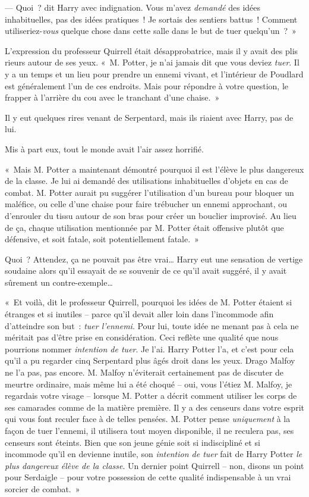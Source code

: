 --- Quoi~? dit Harry avec indignation. Vous m'avez \emph{demandé} des idées inhabituelles, pas des idées pratiques~! Je sortais des sentiers battus~! Comment utiliseriez-\emph{vous} quelque chose dans cette salle dans le but de tuer quelqu'un~?~»

L'expression du professeur Quirrell était désapprobatrice, mais il y avait des plis rieurs autour de ses yeux. «~M. Potter, je n'ai jamais dit que vous deviez \emph{tuer}. Il y a un temps et un lieu pour prendre un ennemi vivant, et l'intérieur de Poudlard est généralement l'un de ces endroits. Mais pour répondre à votre question, le frapper à l'arrière du cou avec le tranchant d'une chaise.~»

Il y eut quelques rires venant de Serpentard, mais ils riaient avec Harry, pas de lui.

Mis à part eux, tout le monde avait l'air assez horrifié.

«~Mais M. Potter a maintenant démontré pourquoi il est l'élève le plus dangereux de la classe. Je lui ai demandé des utilisations inhabituelles d'objets en cas de combat. M. Potter aurait pu suggérer l'utilisation d'un bureau pour bloquer un maléfice, ou celle d'une chaise pour faire trébucher un ennemi approchant, ou d'enrouler du tissu autour de son bras pour créer un bouclier improvisé. Au lieu de ça, chaque utilisation mentionnée par M. Potter était offensive plutôt que défensive, et soit fatale, soit potentiellement fatale.~»

Quoi~? Attendez, ça ne pouvait pas être vrai… Harry eut une sensation de vertige soudaine alors qu'il essayait de se souvenir de ce qu'il avait suggéré, il y avait sûrement un contre-exemple…

«~Et voilà, dit le professeur Quirrell, pourquoi les idées de M. Potter étaient si étranges et si inutiles -- parce qu'il devait aller loin dans l'incommode afin d'atteindre son but~: \emph{tuer l'ennemi}. Pour lui, toute idée ne menant pas à cela ne méritait pas d'être prise en considération. Ceci reflète une qualité que nous pourrions nommer \emph{intention de tuer}. Je l'ai. Harry Potter l'a, et c'est pour cela qu'il a pu regarder cinq Serpentard plus âgés droit dans les yeux. Drago Malfoy ne l'a pas, pas encore. M. Malfoy n'éviterait certainement pas de discuter de meurtre ordinaire, mais même lui a été choqué -- oui, vous l'étiez M. Malfoy, je regardais votre visage -- lorsque M. Potter a décrit comment utiliser les corps de ses camarades comme de la matière première. Il y a des censeurs dans votre esprit qui vous font reculer face à de telles pensées. M. Potter pense \emph{uniquement} à la façon de tuer l'ennemi, il utilisera tout moyen disponible, il ne reculera pas, ses censeurs sont éteints. Bien que son jeune génie soit si indiscipliné et si incommode qu'il en devienne inutile, son \emph{intention de tuer} fait de Harry Potter \emph{le plus dangereux élève de la classe}. Un dernier point Quirrell -- non, disons un point pour Serdaigle -- pour votre possession de cette qualité indispensable à un vrai sorcier de combat.~»

